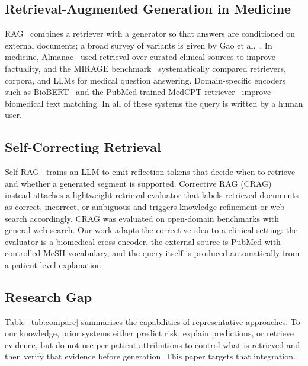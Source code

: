 \documentclass[conference]{IEEEtran}
\begin{document}
\subsection{Retrieval-Augmented Generation in Medicine}
RAG~\cite{lewis2020rag} combines a retriever with a generator so that
answers are conditioned on external documents; a broad survey of variants
is given by Gao et al.~\cite{gao2023ragsurvey}. In medicine,
Almanac~\cite{zakka2024almanac} used retrieval over curated clinical sources
to improve factuality, and the MIRAGE benchmark~\cite{xiong2024medrag}
systematically compared retrievers, corpora, and LLMs for medical question
answering. Domain-specific encoders such as
BioBERT~\cite{lee2020biobert} and the PubMed-trained MedCPT
retriever~\cite{jin2023medcpt} improve biomedical text matching. In all of
these systems the query is written by a human user.

\subsection{Self-Correcting Retrieval}
Self-RAG~\cite{asai2024selfrag} trains an LLM to emit reflection tokens that
decide when to retrieve and whether a generated segment is supported.
Corrective RAG (CRAG)~\cite{yan2024crag} instead attaches a lightweight
retrieval evaluator that labels retrieved documents as correct, incorrect,
or ambiguous and triggers knowledge refinement or web search accordingly.
CRAG was evaluated on open-domain benchmarks with general web search. Our
work adapts the corrective idea to a clinical setting: the evaluator is a
biomedical cross-encoder, the external source is PubMed with controlled
MeSH vocabulary, and the query itself is produced automatically from a
patient-level explanation.

\subsection{Research Gap}
Table~\ref{tab:compare} summarises the capabilities of representative
approaches. To our knowledge, prior systems either predict risk, explain
predictions, or retrieve evidence, but do not use per-patient attributions
to control what is retrieved and then verify that evidence before
generation. This paper targets that integration.
\end{document}
